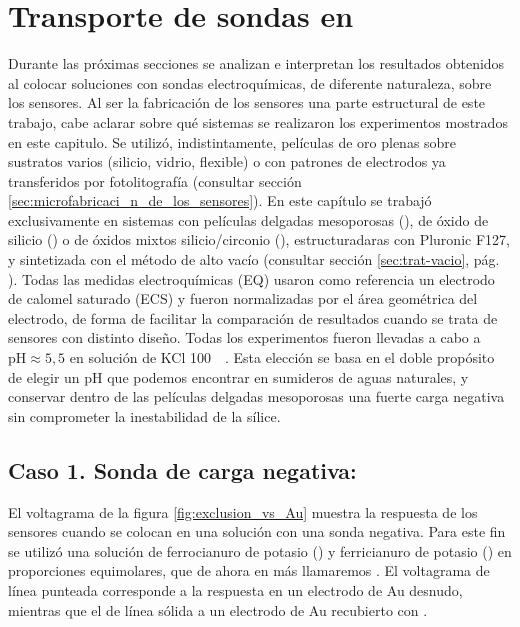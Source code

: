 \section{Transporte de sondas en \pdm}

	 Durante las próximas secciones se analizan e interpretan los resultados obtenidos al colocar soluciones con sondas electroquímicas, de diferente naturaleza, sobre los sensores. Al ser la fabricación de los sensores una parte estructural de este trabajo, cabe aclarar sobre qué sistemas se realizaron los experimentos mostrados en este capitulo. Se utilizó, indistintamente, películas de oro plenas sobre sustratos varios (silicio, vidrio, flexible)  o con patrones de electrodos ya transferidos por fotolitografía (consultar sección \ref{sec:microfabricaci_n_de_los_sensores}). En este capítulo se trabajó exclusivamente en sistemas con películas delgadas mesoporosas (\pdm), de óxido de silicio (\pdmF) o de óxidos mixtos silicio/circonio (\pdmZ), estructuradaras con Pluronic F127, y sintetizada con el método de alto vacío (consultar sección \ref{sec:trat-vacio}, pág. \pageref{sec:trat-vacio}). Todas las medidas electroquímicas (EQ) usaron como referencia un electrodo de calomel saturado  (ECS) y fueron normalizadas por el área geométrica del electrodo, de forma de facilitar la comparación de resultados cuando se trata de sensores con distinto diseño. Todas los experimentos fueron llevadas a cabo a $\text{pH}\approx5,5$ en solución de KCl \SI{100}{\milli\Molar}. Esta elección se basa en el doble propósito de elegir un pH que podemos encontrar en sumideros de aguas naturales, y conservar dentro de las películas delgadas mesoporosas una fuerte carga negativa sin comprometer la inestabilidad de la sílice.

	\subsection{Caso 1. Sonda de carga negativa: \texorpdfstring{\ferroferri}{ferroferri}}

	 El voltagrama de la figura \ref{fig:exclusion_vs_Au} muestra la respuesta de los sensores cuando se colocan en una solución con una sonda negativa. Para este fin se utilizó una solución de ferrocianuro de potasio (\ferroCompleto) y ferricianuro de potasio (\ferriCompleto) en proporciones equimolares, que de ahora en más llamaremos \fe. El voltagrama de línea punteada corresponde a la respuesta en un electrodo de Au desnudo, mientras que el de línea sólida a un electrodo de Au recubierto con \pdmF.
	

